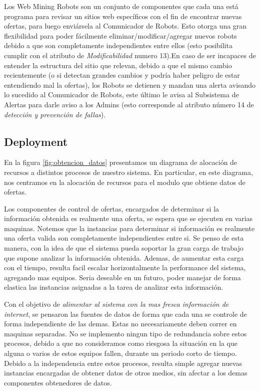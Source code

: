 Los \textsf{Web Mining Robots} son un conjunto de componentes que cada una está programa para revisar un sitios web específicos con el fin de encontrar nuevas ofertas, para luego enviársela al \textsf{Comunicador de Robots}. Esto otorga una gran flexibilidad para poder fácilmente eliminar/modificar/agregar nuevos robots debido a que son completamente independientes entre ellos (esto posibilita cumplir con el atributo de \emph{Modificabilidad} numero 13).En caso de ser incapaces de entender la estructura del sitio que relevan, debido a que el mismo cambio recientemente (o si detectan grandes cambios y podría haber peligro de estar entendiendo mal la ofertas), los Robots se detienen y mandan una alerta avisando lo sucedido al \textsf{Comunicador de Robots}, este último le avisa al \textsf{Subsistema de Alertas} para darle aviso a los Admins (esto corresponde al atributo número 14 de \emph{detección y prevención de fallas}).
\vspace{9pt}


\subsection{Deployment}

En la figura \ref{fig:obtencion_datos} presentamos un diagrama de alocación de recursos a distintos procesos de nuestro sistema. En particular, en este diagrama, nos centramos en la alocación de recursos para el modulo que obtiene datos de ofertas. 

Los componentes de control de ofertas, encargados de determinar si la información obtenida es realmente una oferta, se espera que se ejecuten en varias maquinas. Notemos que la instancias para determinar si información es realmente una oferta valida son completamente independientes entre si. Se penso de esta manera, con la idea de que el sistema pueda soportar la gran carga de trabajo que supone analizar la información obtenida. Ademas, de aumentar esta carga con el tiempo, resulta facil escalar horizontalmente la performance del sistema, agregando mas equipos. Seria deseable en un futuro, poder manejar de forma elastica las instancias asignadas a la tarea de analizar esta información.

Con el objetivo de \emph{alimentar al sistema con la mas fresca información de internet}, se pensaron las fuentes de datos de forma que cada una se controle de forma independiente de las demas. Estas no necesariamente deben correr en maquinas separadas. No se implemento ningun tipo de redundancia sobre estos procesos, debido a que no consideramos como riesgosa la situación en la que alguna o varios de estos equipos fallen, durante un periodo corto de tiempo. Debido a la independencia entre estos procesos, resulta simple agregar nuevas instancias encargadas de obtener datos de otros medios, sin afectar a los demas componentes obtenedores de datos.

